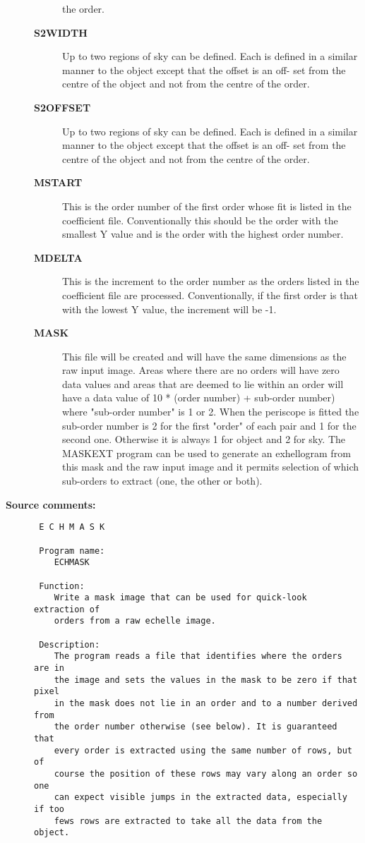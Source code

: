 \begin{description}
\begin{description}
 the order.
\item [{\bf S2WIDTH}]
 Up to two regions of sky can be defined. Each is defined in a
 similar manner to the object except that the offset is an off-
 set from the centre of the object and not from the centre of
 the order.
\item [{\bf S2OFFSET}]
 Up to two regions of sky can be defined. Each is defined in a
 similar manner to the object except that the offset is an off-
 set from the centre of the object and not from the centre of
 the order.
\item [{\bf MSTART}]
 This is the order number of the first order whose fit is
 listed in the coefficient file. Conventionally this should
 be the order with the smallest Y value and is the order with
 the highest order number.
\item [{\bf MDELTA}]
 This is the increment to the order number as the orders listed
 in the coefficient file are processed. Conventionally, if the
 first order is that with the lowest Y value, the increment
 will be -1.
\item [{\bf MASK}]
 This file will be created and will have the same dimensions
 as the raw input image. Areas where there are no orders will
 have zero data values and areas that are deemed to lie within
 an order will have a data value of 10 * (order number) +
 sub-order number) where "sub-order number" is 1 or 2. When
 the periscope is fitted the sub-order number is 2 for the
 first "order" of each pair and 1 for the second one. Otherwise
 it is always 1 for object and 2 for sky. The MASKEXT program
 can be used to generate an exhellogram from this mask and the
 raw input image and it permits selection of which sub-orders
 to extract (one, the other or both).
\end{description}

\item [{\bf Source comments:}]
\begin{verbatim}
 E C H M A S K

 Program name:
    ECHMASK

 Function:
    Write a mask image that can be used for quick-look extraction of
    orders from a raw echelle image.

 Description:
    The program reads a file that identifies where the orders are in
    the image and sets the values in the mask to be zero if that pixel
    in the mask does not lie in an order and to a number derived from
    the order number otherwise (see below). It is guaranteed that
    every order is extracted using the same number of rows, but of
    course the position of these rows may vary along an order so one
    can expect visible jumps in the extracted data, especially if too
    fews rows are extracted to take all the data from the object.


\end{verbatim}
\end{description}
